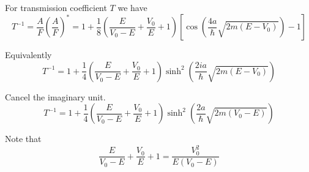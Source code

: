 For transmission coefficient $T$ we have
\begin{equation*}
T^{-1}=\frac{A}{F}\left(\frac{A}{F}\right)^*
=1+\frac{1}{8}\left(\frac{E}{V_0-E}+\frac{V_0}{E}+1\right)
\left[\cos\left(\frac{4a}{\hbar}\sqrt{2m(E-V_0)}\right)-1\right]
\tag{9}
\end{equation*}

Equivalently
\begin{equation*}
T^{-1}=1+\frac{1}{4}\left(\frac{E}{V_0-E}+\frac{V_0}{E}+1\right)
\sinh^2\left(\frac{2ia}{\hbar}\sqrt{2m(E-V_0)}\right)
\tag{10}
\end{equation*}

Cancel the imaginary unit.
\begin{equation*}
T^{-1}=1+\frac{1}{4}\left(\frac{E}{V_0-E}+\frac{V_0}{E}+1\right)
\sinh^2\left(\frac{2a}{\hbar}\sqrt{2m(V_0-E)}\right)
\end{equation*}

Note that
\begin{equation*}
\frac{E}{V_0-E}+\frac{V_0}{E}+1=\frac{V_0^2}{E(V_0-E)}
\tag{11}
\end{equation*}


